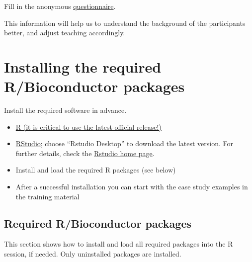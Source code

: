 \documentclass[
  oneside]{book}
\begin{document}
Fill in the anonymous \href{https://forms.gle/XZdiEyGyYtLKYwqp8}{questionnaire}.

This information will help us to understand the background of the
participants better, and adjust teaching accordingly.

\hypertarget{packages}{%
\section{Installing the required R/Bioconductor packages}\label{packages}}

Install the required software in advance.

\begin{itemize}
\item
  \href{https://www.r-project.org/}{R (it is critical to use the latest official release!)}
\item
  \href{https://www.rstudio.com/products/rstudio/download/}{RStudio};
  choose ``Rstudio Desktop'' to download the latest version. For further
  details, check the \href{https://www.rstudio.com/}{Rstudio home page}.
\item
  Install and load the required R packages (see below)
\item
  After a successful installation you can start with the
  case study examples in the training material
\end{itemize}

\hypertarget{required-rbioconductor-packages}{%
\subsection{Required R/Bioconductor packages}\label{required-rbioconductor-packages}}

This section shows how to install and load all required packages into
the R session, if needed. Only uninstalled packages are installed.
\end{document}
